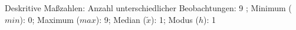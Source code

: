 				\label{tableValues:astu06b}
				\vspace*{-\baselineskip}
                    \begin{noten}
                	    \note{} Deskritive Maßzahlen:
                	    Anzahl unterschiedlicher Beobachtungen: 9%
                	    ; 
                	      Minimum ($min$): 0; 
                	      Maximum ($max$): 9; 
                	      Median ($\tilde{x}$): 1; 
                	      Modus ($h$): 1
                     \end{noten}


